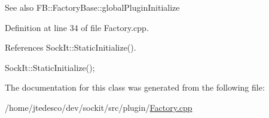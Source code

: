 \begin{DoxySeeAlso}{See also}
FB::FactoryBase::globalPluginInitialize 
\end{DoxySeeAlso}


Definition at line 34 of file Factory.cpp.



References SockIt::StaticInitialize().


\begin{DoxyCode}
        {
            SockIt::StaticInitialize();
        }
\end{DoxyCode}


The documentation for this class was generated from the following file:\begin{DoxyCompactItemize}
\item 
/home/jtedesco/dev/sockit/src/plugin/\hyperlink{Factory_8cpp}{Factory.cpp}\end{DoxyCompactItemize}
